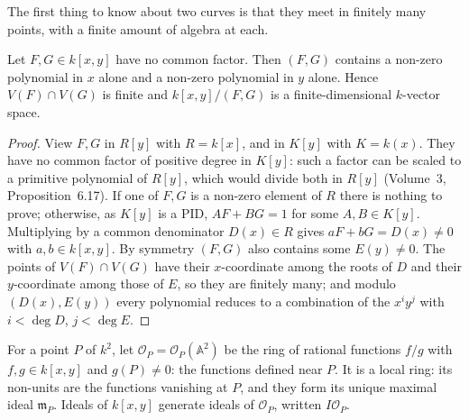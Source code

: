 The first thing to know about two curves is that they meet in finitely many points, with a finite amount of algebra at each.

\begin{lemma}\label{lem:finite}
Let $F,G\in k[x,y]$ have no common factor. Then $(F,G)$ contains a non-zero polynomial in $x$ alone and a non-zero polynomial in $y$ alone.
Hence $V(F)\cap V(G)$ is finite and $k[x,y]/(F,G)$ is a finite-dimensional $k$-vector space.
\end{lemma}
\begin{proof}
View $F,G$ in $R[y]$ with $R=k[x]$, and in $K[y]$ with $K=k(x)$. They have no common factor of positive degree in $K[y]$: such a factor can
be scaled to a primitive polynomial of $R[y]$, which would divide both in $R[y]$ (Volume~3, Proposition~6.17). If one of $F,G$ is a non-zero
element of $R$ there is nothing to prove; otherwise, as $K[y]$ is a PID, $AF+BG=1$ for some $A,B\in K[y]$. Multiplying by a common denominator
$D(x)\in R$ gives $aF+bG=D(x)\ne0$ with $a,b\in k[x,y]$. By symmetry $(F,G)$ also contains some $E(y)\ne0$. The points of $V(F)\cap V(G)$ have their
$x$-coordinate among the roots of $D$ and their $y$-coordinate among those of $E$, so they are finitely many; and modulo $(D(x),E(y))$ every
polynomial reduces to a combination of the $x^iy^j$ with $i<\deg D$, $j<\deg E$.
\end{proof}

For a point $P$ of $k^2$, let $\mathcal O_P=\mathcal O_P(\mathbb A^2)$ be the ring of rational functions $f/g$ with $f,g\in k[x,y]$ and $g(P)\ne0$:
the functions defined near $P$. It is a local ring: its non-units are the functions vanishing at $P$, and they form its unique maximal ideal
$\mathfrak m_P$. Ideals of $k[x,y]$ generate ideals of $\mathcal O_P$, written $I\mathcal O_P$.

